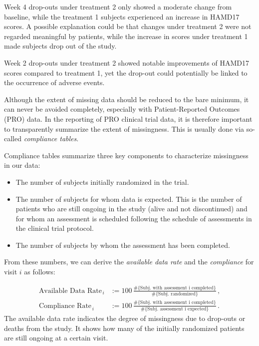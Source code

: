 \documentclass[
  letterpaper,
  DIV=11,
  numbers=noendperiod]{scrreprt}
\begin{document}
Week 4 drop-outs under treatment 2 only showed a moderate change from
baseline, while the treatment 1 subjects experienced an increase in
HAMD17 scores. A possible explanation could be that changes under
treatment 2 were not regarded meaningful by patients, while the increase
in scores under treatment 1 made subjects drop out of the study.

Week 2 drop-outs under treatment 2 showed notable improvements of HAMD17
scores compared to treatment 1, yet the drop-out could potentially be
linked to the occurrence of adverse events.

Although the extent of missing data should be reduced to the bare
minimum, it can never be avoided completely, especially with
Patient-Reported Outcomes (PRO) data. In the reporting of PRO clinical
trial data, it is therefore important to transparently summarize the
extent of missingness. This is usually done via so-called
\emph{compliance tables}.

Compliance tables summarize three key components to characterize
missingness in our data:

\begin{itemize}
\item
  The number of subjects initially randomized in the trial.
\item
  The number of subjects for whom data is expected. This is the number
  of patients who are still ongoing in the study (alive and not
  discontinued) and for whom an assessment is scheduled following the
  schedule of assessments in the clinical trial protocol.
\item
  The number of subjects by whom the assessment has been completed.
\end{itemize}

From these numbers, we can derive the \emph{available data rate} and the
\emph{compliance} for visit \(i\) as follows:

\[
\begin{align}
\text{Available Data Rate}_{\,i} &:= 100\,\frac{\#\{\text{Subj. with assessment i completed}\}}{\#\{\text{Subj. randomized}\}}\,,\\
\text{Compliance Rate}_{\,i} &:= 100\,\frac{\#\{\text{Subj. with assessment i completed}\}}{\#\{\text{Subj. assessment i expected}\}}\,.
\end{align}
\] The available data rate indicates the degree of missingness due to
drop-outs or deaths from the study. It shows how many of the initially
randomized patients are still ongoing at a certain visit.
\end{document}
